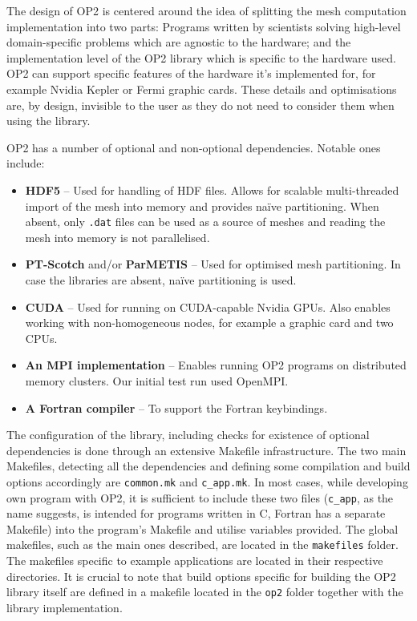 The design of OP2 is centered around the idea of splitting the mesh computation implementation into two parts: Programs written by scientists solving high-level domain-specific problems which are agnostic to the hardware; and the implementation level of the OP2 library which is specific to the hardware used. OP2 can support  specific features of the hardware it's implemented for, for example Nvidia Kepler or Fermi graphic cards. These details and optimisations are, by design, invisible to the user as they do not need to consider them when using the library.

OP2 has a number of optional and non-optional dependencies. Notable ones include:
\begin{itemize}
    \item \textbf{HDF5} -- Used for handling of HDF files. Allows for scalable multi-threaded import of the mesh into memory and provides naïve partitioning. When absent, only \texttt{.dat} files can be used as a source of meshes and reading the mesh into memory is not parallelised.
    \item \textbf{PT-Scotch} and/or \textbf{ParMETIS} -- Used for optimised mesh partitioning. In case the libraries are absent, naïve partitioning is used.
    \item \textbf{CUDA} -- Used for running on CUDA-capable Nvidia GPUs. Also enables working with non-homogeneous nodes, for example a graphic card and two CPUs.
    \item \textbf{An MPI implementation} -- Enables running OP2 programs on distributed memory clusters. Our initial test run used OpenMPI. 
    \item \textbf{A Fortran compiler} -- To support the Fortran keybindings.
\end{itemize}

The configuration of the library, including checks for existence of optional dependencies is done through an extensive Makefile infrastructure. The two main Makefiles, detecting all the dependencies and defining some compilation and build options accordingly are \texttt{common.mk} and \texttt{c\_app.mk}. In most cases, while developing own program with OP2, it is sufficient to include these two files (\texttt{c\_app}, as the name suggests, is intended for programs written in C, Fortran has a separate Makefile) into the program's Makefile and utilise variables provided. The global makefiles, such as the main ones described, are located in the \texttt{makefiles} folder. The makefiles specific to example applications are located in their respective directories. It is crucial to note that build options specific for building the OP2 library itself are defined in a makefile located in the \texttt{op2} folder together with the library implementation. 

